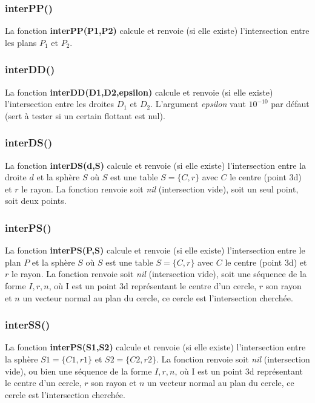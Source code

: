\subsubsection{interPP()}
La fonction \textbf{interPP(P1,P2)} calcule et renvoie (si elle existe) l'intersection entre les plans $P_1$ et $P_2$.

\subsubsection{interDD()}
La fonction \textbf{interDD(D1,D2,epsilon)} calcule et renvoie (si elle existe) l'intersection entre les droites $D_1$ et $D_2$. L'argument \emph{epsilon} vaut $10^{-10}$ par défaut (sert à tester si un certain flottant est nul).

\subsubsection{interDS()}
La fonction \textbf{interDS(d,S)} calcule et renvoie (si elle existe) l'intersection entre la droite $d$ et la sphère $S$ où $S$ est une table $S=\{C,r\}$ avec $C$ le centre (point 3d) et $r$ le rayon. La fonction renvoie soit \emph{nil} (intersection vide), soit un seul point, soit deux points.

\subsubsection{interPS()}
La fonction \textbf{interPS(P,S)} calcule et renvoie (si elle existe) l'intersection entre le plan $P$ et la sphère $S$ où $S$ est une table $S=\{C,r\}$ avec $C$ le centre (point 3d) et $r$ le rayon. La fonction renvoie soit \emph{nil} (intersection vide), soit une séquence de la forme $I,r,n$, où I est un point 3d représentant le centre d'un cercle, $r$ son rayon et $n$ un vecteur normal au plan du cercle, ce cercle est l'intersection cherchée. 

\subsubsection{interSS()}
La fonction \textbf{interPS(S1,S2)} calcule et renvoie (si elle existe) l'intersection entre la sphère $S1=\{C1,r1\}$ et $S2=\{C2,r2\}$. La fonction renvoie soit \emph{nil} (intersection vide), ou bien une séquence de la forme $I,r,n$, où I est un point 3d représentant le centre d'un cercle, $r$ son rayon et $n$ un vecteur normal au plan du cercle, ce cercle est l'intersection cherchée. 

